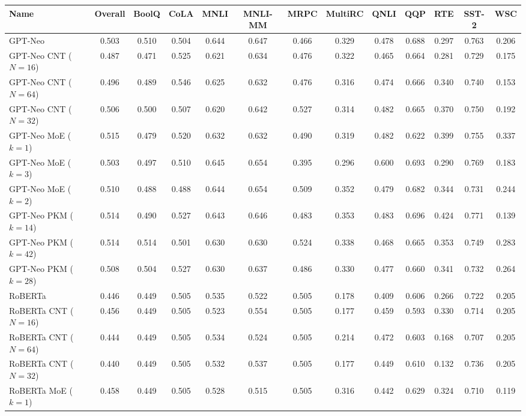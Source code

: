 \begin{tabular}{lcccccccccccc}
\toprule
Name & Overall & BoolQ & CoLA & MNLI & MNLI-MM & MRPC & MultiRC & QNLI & QQP & RTE & SST-2 & WSC \\
\midrule
GPT-Neo & 0.503 & 0.510 & 0.504 & 0.644 & 0.647 & 0.466 & 0.329 & 0.478 & 0.688 & 0.297 & 0.763 & 0.206 \\
GPT-Neo CNT ($N=16$) & 0.487 & 0.471 & 0.525 & 0.621 & 0.634 & 0.476 & 0.322 & 0.465 & 0.664 & 0.281 & 0.729 & 0.175 \\
GPT-Neo CNT ($N=64$) & 0.496 & 0.489 & 0.546 & 0.625 & 0.632 & 0.476 & 0.316 & 0.474 & 0.666 & 0.340 & 0.740 & 0.153 \\
GPT-Neo CNT ($N=32$) & 0.506 & 0.500 & 0.507 & 0.620 & 0.642 & 0.527 & 0.314 & 0.482 & 0.665 & 0.370 & 0.750 & 0.192 \\
GPT-Neo MoE ($k=1$) & 0.515 & 0.479 & 0.520 & 0.632 & 0.632 & 0.490 & 0.319 & 0.482 & 0.622 & 0.399 & 0.755 & 0.337 \\
GPT-Neo MoE ($k=3$) & 0.503 & 0.497 & 0.510 & 0.645 & 0.654 & 0.395 & 0.296 & 0.600 & 0.693 & 0.290 & 0.769 & 0.183 \\
GPT-Neo MoE ($k=2$) & 0.510 & 0.488 & 0.488 & 0.644 & 0.654 & 0.509 & 0.352 & 0.479 & 0.682 & 0.344 & 0.731 & 0.244 \\
GPT-Neo PKM ($k=14$) & 0.514 & 0.490 & 0.527 & 0.643 & 0.646 & 0.483 & 0.353 & 0.483 & 0.696 & 0.424 & 0.771 & 0.139 \\
GPT-Neo PKM ($k=42$) & 0.514 & 0.514 & 0.501 & 0.630 & 0.630 & 0.524 & 0.338 & 0.468 & 0.665 & 0.353 & 0.749 & 0.283 \\
GPT-Neo PKM ($k=28$) & 0.508 & 0.504 & 0.527 & 0.630 & 0.637 & 0.486 & 0.330 & 0.477 & 0.660 & 0.341 & 0.732 & 0.264 \\
\hline
RoBERTa & 0.446 & 0.449 & 0.505 & 0.535 & 0.522 & 0.505 & 0.178 & 0.409 & 0.606 & 0.266 & 0.722 & 0.205 \\
RoBERTa CNT ($N=16$) & 0.456 & 0.449 & 0.505 & 0.523 & 0.554 & 0.505 & 0.177 & 0.459 & 0.593 & 0.330 & 0.714 & 0.205 \\
RoBERTa CNT ($N=64$) & 0.444 & 0.449 & 0.505 & 0.534 & 0.524 & 0.505 & 0.214 & 0.472 & 0.603 & 0.168 & 0.707 & 0.205 \\
RoBERTa CNT ($N=32$) & 0.440 & 0.449 & 0.505 & 0.532 & 0.537 & 0.505 & 0.177 & 0.449 & 0.610 & 0.132 & 0.736 & 0.205 \\
RoBERTa MoE ($k=1$) & 0.458 & 0.449 & 0.505 & 0.528 & 0.515 & 0.505 & 0.316 & 0.442 & 0.629 & 0.324 & 0.710 & 0.119 \\

\end{tabular}
